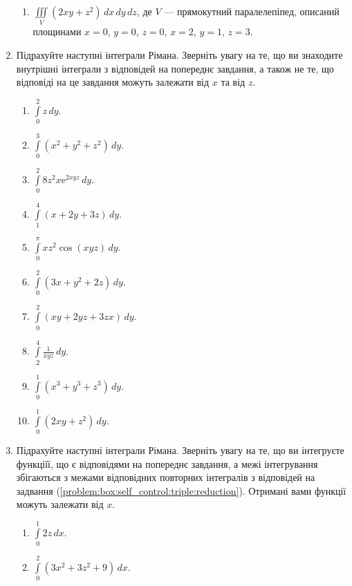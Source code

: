\begin{enumerate}
\begin{enumerate}[label*=\arabic*.]
        \item  $\iiint\limits_{V} \left(2xy + z^2\right) \, dx \, dy \, dz$, де $V$ --- прямокутний паралелепіпед, описаний площинами $x = 0$, $y = 0$, $z = 0$, $x = 2$, $y = 1$, $z = 3$.
    \end{enumerate}
\item \label{problem:box:self_control:triple:inner}Підрахуйте наступні інтеграли Рімана. Зверніть увагу на те, що ви знаходите внутрішні інтеграли з відповідей на попереднє завдання, а також не те, що відповіді на це завдання можуть залежати від $x$ та від $z$.
\begin{multicols}{2}
    \begin{enumerate}[label*=\arabic*.]
        \item $\int\limits_0^2 z \,dy$.
        \item $\int\limits_0^3 \left(x^2 + y^2 + z^2\right) \,dy$.
        \item $\int\limits_0^2 8 z^{2} x {\mathrm e}^{{2}{}{x}{}{y}{}{z}} \,dy$.
        \item $\int\limits_1^4 \left(x + 2y + 3z\right) \,dy$.
        \item $\int\limits_0^\pi {x}{}{z^{{2}}}{}{\cos}{\left({x}{}{y}{}{z}\right)} \,dy$.
        \item $\int\limits_0^2 \left(3x + y^2 + 2z\right) \,dy$.
        \item $\int\limits_0^2 \left(xy + 2yz + 3zx\right) \,dy$.
        \item $\int\limits_2^4 \frac{1}{xyz} \,dy$.
        \item $\int\limits_0^1 \left(x^3 + y^3 + z^3\right) \,dy$.
        \item $\int\limits_0^1 \left(2xy + z^2\right) \,dy$.
    \end{enumerate}
\end{multicols}
\item\label{problem:box:self_control:triple:middle} Підрахуйте наступні інтеграли Рімана. Зверніть увагу на те, що ви інтегруєте функціїї, що є відповідями на попереднє завдання, а межі інтегрування збігаються з межами відповідних повторних інтегралів з відповідей на задвання (\ref{problem:box:self_control:triple:reduction}). Отримані вами функції можуть залежати від $x$.
\begin{multicols}{2}
    \begin{enumerate}[label*=\arabic*.]
        \item $\int\limits_0^1 2z \,dx$.
        \item $\int\limits_0^2 \left(3 x^{2}+3 z^{2}+9\right) \,dx$.

\end{enumerate}
\end{multicols}
\end{enumerate}
